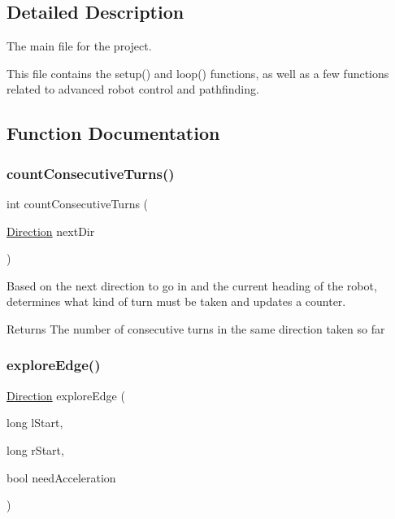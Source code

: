 \subsection{Detailed Description}
The main file for the project. 

This file contains the setup() and loop() functions, as well as a few functions related to advanced robot control and pathfinding. 

\subsection{Function Documentation}
\mbox{\label{PCB__test_8ino_a1f32d7057151c1c7f0f16a945a27af1e}} 
\subsubsection{\texorpdfstring{count\+Consecutive\+Turns()}{countConsecutiveTurns()}}
{\footnotesize\ttfamily int count\+Consecutive\+Turns (\begin{DoxyParamCaption}\item[{\hyperlink{util_8h_a92e22a126ad6bf9d255b517e70d083f6}{Direction}}]{next\+Dir }\end{DoxyParamCaption})}

Based on the next direction to go in and the current heading of the robot, determines what kind of turn must be taken and updates a counter.

\begin{DoxyReturn}{Returns}
The number of consecutive turns in the same direction taken so far 
\end{DoxyReturn}
\mbox{\label{PCB__test_8ino_abc9fd4d649a1719e3e8f25cf3fd22857}} 
\subsubsection{\texorpdfstring{explore\+Edge()}{exploreEdge()}}
{\footnotesize\ttfamily \hyperlink{util_8h_a92e22a126ad6bf9d255b517e70d083f6}{Direction} explore\+Edge (\begin{DoxyParamCaption}\item[{long}]{l\+Start,  }\item[{long}]{r\+Start,  }\item[{bool}]{need\+Acceleration }\end{DoxyParamCaption})}



